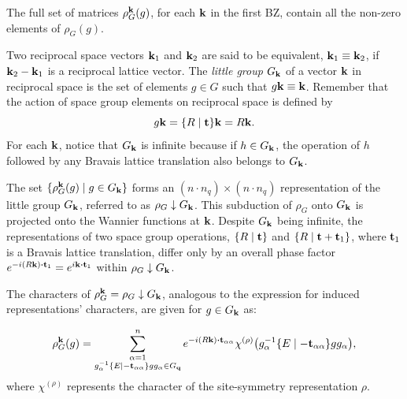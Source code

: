 \documentclass[12pt]{report}
\begin{document}
The full set of matrices $\rho_G^{\vb{k}}(g)$, for each ${\vb{k}}$ in the first BZ, contain all the non-zero elements of $\rho_G(g)$.


\begin{definition}
Two reciprocal space vectors ${\vb{k}}_1$ and ${\vb{k}}_2$ are said to be equivalent, ${\vb{k}}_1 \equiv {\vb{k}}_2$, if ${\vb{k}}_2 - {\vb{k}}_1$ is a reciprocal lattice vector. The \textit{little group} $G_{\vb{k}}$ of a vector ${\vb{k}}$ in reciprocal space is the set of elements $g \in G$ such that $g {\vb{k}} \equiv {\vb{k}}$. Remember that the action of space group elements on reciprocal space is defined by
$$
g{\vb{k}} = \{ R \mid {\vb{t}} \}{\vb{k}} = R{\vb{k}}.
$$
For each ${\vb{k}}$, notice that $G_{\vb{k}}$ is infinite because if $h \in G_{\vb{k}}$, the operation of $h$ followed by any Bravais lattice translation also belongs to $G_{\vb{k}}$.
\end{definition}

\n

The set \(\{\rho_G^{\vb{k}}(g) \mid g \in G_{\vb{k}}\}\) forms an \((n \cdot n_q) \times (n \cdot n_q)\) representation of the little group \(G_{\vb{k}}\), referred to as \(\rho_G \downarrow G_{\vb{k}}\). This subduction of \(\rho_G\) onto \(G_{\vb{k}}\) is projected onto the Wannier functions at \({\vb{k}}\). Despite \(G_{\vb{k}}\) being infinite, the representations of two space group operations, \(\{ R \mid {\vb{t}} \}\) and \(\{ R \mid {\vb{t}} + {\vb{t}}_1 \}\), where \({\vb{t}}_1\) is a Bravais lattice translation, differ only by an overall phase factor \(e^{-i(R\k) \vdot \t_1} = e^{i\k \vdot \t_1}\) within \(\rho_G \downarrow G_{\vb{k}}\).

The characters of \(\rho_G^{\vb{k}} = \rho_G \downarrow G_{\vb{k}}\), analogous to the expression for induced representations' characters, are given for \(g \in G_{\vb{k}}\) as:

\begin{equation} \label{eq:}
\rho_G^\k(g) =
\sum_{\substack{\alpha=1 \\ g_\alpha^{-1}\sg{E}{-\t_{\alpha\alpha}}g g_\alpha \in G_\q}}^n e^{-i(R\k)\vdot\t_{\alpha\alpha}}
\chi^{(\rho)}\qty(g_\alpha^{-1}\sg{E}{-\t_{\alpha\alpha}}g g_\alpha),
\end{equation}
where \(\chi^{(\rho)}\) represents the character of the site-symmetry representation \(\rho\).
\end{document}
